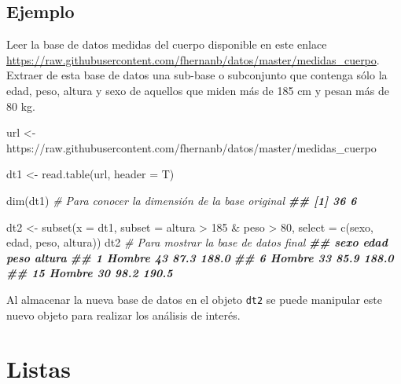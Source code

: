 \documentclass[
]{book}
\newenvironment{Shaded}{\begin{snugshade}}{\end{snugshade}}
\newcommand{\AttributeTok}[1]{\textcolor[rgb]{0.77,0.63,0.00}{#1}}
\newcommand{\CommentTok}[1]{\textcolor[rgb]{0.56,0.35,0.01}{\textit{#1}}}
\newcommand{\DecValTok}[1]{\textcolor[rgb]{0.00,0.00,0.81}{#1}}
\newcommand{\DocumentationTok}[1]{\textcolor[rgb]{0.56,0.35,0.01}{\textbf{\textit{#1}}}}
\newcommand{\FunctionTok}[1]{\textcolor[rgb]{0.00,0.00,0.00}{#1}}
\newcommand{\NormalTok}[1]{#1}
\newcommand{\OtherTok}[1]{\textcolor[rgb]{0.56,0.35,0.01}{#1}}
\newcommand{\SpecialCharTok}[1]{\textcolor[rgb]{0.00,0.00,0.00}{#1}}
\newcommand{\StringTok}[1]{\textcolor[rgb]{0.31,0.60,0.02}{#1}}
\begin{document}
\hypertarget{ejemplo-4}{%
\subsection*{Ejemplo}\label{ejemplo-4}}

Leer la base de datos medidas del cuerpo disponible en este enlace \url{https://raw.githubusercontent.com/fhernanb/datos/master/medidas_cuerpo}. Extraer de esta base de datos una sub-base o subconjunto que contenga sólo la edad, peso, altura y sexo de aquellos que miden más de 185 cm y pesan más de 80 kg.

\begin{Shaded}
\begin{Highlighting}[]
\NormalTok{url }\OtherTok{\textless{}{-}} \StringTok{\textquotesingle{}https://raw.githubusercontent.com/fhernanb/datos/master/medidas\_cuerpo\textquotesingle{}}

\NormalTok{dt1 }\OtherTok{\textless{}{-}} \FunctionTok{read.table}\NormalTok{(url, }\AttributeTok{header =}\NormalTok{ T)}

\FunctionTok{dim}\NormalTok{(dt1)  }\CommentTok{\# Para conocer la dimensión de la base original }
\DocumentationTok{\#\# [1] 36  6}

\NormalTok{dt2 }\OtherTok{\textless{}{-}} \FunctionTok{subset}\NormalTok{(}\AttributeTok{x =}\NormalTok{ dt1, }\AttributeTok{subset =}\NormalTok{ altura }\SpecialCharTok{\textgreater{}} \DecValTok{185} \SpecialCharTok{\&}\NormalTok{ peso }\SpecialCharTok{\textgreater{}} \DecValTok{80}\NormalTok{,}
               \AttributeTok{select =} \FunctionTok{c}\NormalTok{(}\StringTok{\textquotesingle{}sexo\textquotesingle{}}\NormalTok{, }\StringTok{\textquotesingle{}edad\textquotesingle{}}\NormalTok{, }\StringTok{\textquotesingle{}peso\textquotesingle{}}\NormalTok{, }\StringTok{\textquotesingle{}altura\textquotesingle{}}\NormalTok{))}
\NormalTok{dt2  }\CommentTok{\# Para mostrar la base de datos final}
\DocumentationTok{\#\#      sexo edad peso altura}
\DocumentationTok{\#\# 1  Hombre   43 87.3  188.0}
\DocumentationTok{\#\# 6  Hombre   33 85.9  188.0}
\DocumentationTok{\#\# 15 Hombre   30 98.2  190.5}
\end{Highlighting}
\end{Shaded}

Al almacenar la nueva base de datos en el objeto \texttt{dt2} se puede manipular este nuevo objeto para realizar los análisis de interés.

\hypertarget{listas}{%
\section{\texorpdfstring{Listas  }{Listas  }}\label{listas}}
\end{document}
